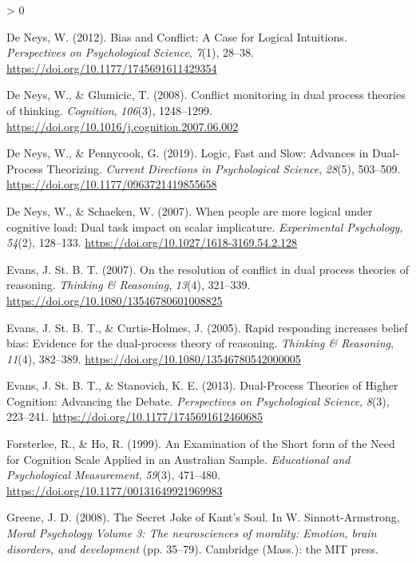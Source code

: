 \documentclass[
  american,
  man,floatsintext]{apa7}
\newlength{\cslhangindent}
\newenvironment{CSLReferences}[2] %
 {%
  \setlength{\parindent}{0pt}
  \ifodd #1 \everypar{\setlength{\hangindent}{\cslhangindent}}\ignorespaces\fi
  \ifnum #2 > 0
  \setlength{\parskip}{#2\baselineskip}
  \fi
 }%
 {}
\begin{document}
\begin{CSLReferences}{1}{0}
\leavevmode\hypertarget{ref-deneys_bias_2012}{}%
De Neys, W. (2012). Bias and {Conflict}: A {Case} for {Logical Intuitions}. \emph{Perspectives on Psychological Science}, \emph{7}(1), 28--38. \url{https://doi.org/10.1177/1745691611429354}

\leavevmode\hypertarget{ref-deneys_conflict_2008}{}%
De Neys, W., \& Glumicic, T. (2008). Conflict monitoring in dual process theories of thinking. \emph{Cognition}, \emph{106}(3), 1248--1299. \url{https://doi.org/10.1016/j.cognition.2007.06.002}

\leavevmode\hypertarget{ref-deneys_logic_2019}{}%
De Neys, W., \& Pennycook, G. (2019). Logic, {Fast} and {Slow}: Advances in {Dual}-{Process Theorizing}. \emph{Current Directions in Psychological Science}, \emph{28}(5), 503--509. \url{https://doi.org/10.1177/0963721419855658}

\leavevmode\hypertarget{ref-deneys_when_2007}{}%
De Neys, W., \& Schaeken, W. (2007). When people are more logical under cognitive load: Dual task impact on scalar implicature. \emph{Experimental Psychology}, \emph{54}(2), 128--133. \url{https://doi.org/10.1027/1618-3169.54.2.128}

\leavevmode\hypertarget{ref-evans_resolution_2007}{}%
Evans, J. St. B. T. (2007). On the resolution of conflict in dual process theories of reasoning. \emph{Thinking \& Reasoning}, \emph{13}(4), 321--339. \url{https://doi.org/10.1080/13546780601008825}

\leavevmode\hypertarget{ref-evans_rapid_2005}{}%
Evans, J. St. B. T., \& Curtis-Holmes, J. (2005). Rapid responding increases belief bias: Evidence for the dual-process theory of reasoning. \emph{Thinking \& Reasoning}, \emph{11}(4), 382--389. \url{https://doi.org/10.1080/13546780542000005}

\leavevmode\hypertarget{ref-evans_dualprocess_2013}{}%
Evans, J. St. B. T., \& Stanovich, K. E. (2013). Dual-{Process Theories} of {Higher Cognition}: Advancing the {Debate}. \emph{Perspectives on Psychological Science}, \emph{8}(3), 223--241. \url{https://doi.org/10.1177/1745691612460685}

\leavevmode\hypertarget{ref-forsterlee_examination_1999}{}%
Forsterlee, R., \& Ho, R. (1999). An {Examination} of the {Short} form of the {Need} for {Cognition Scale Applied} in an {Australian Sample}. \emph{Educational and Psychological Measurement}, \emph{59}(3), 471--480. \url{https://doi.org/10.1177/00131649921969983}

\leavevmode\hypertarget{ref-greene_secret_2008}{}%
Greene, J. D. (2008). The {Secret Joke} of {Kant}'s {Soul}. In W. Sinnott-Armstrong, \emph{Moral {Psychology Volume} 3: The neurosciences of morality: Emotion, brain disorders, and development} (pp. 35--79). {Cambridge (Mass.)}: {the MIT press}.


\end{CSLReferences}
\end{document}
